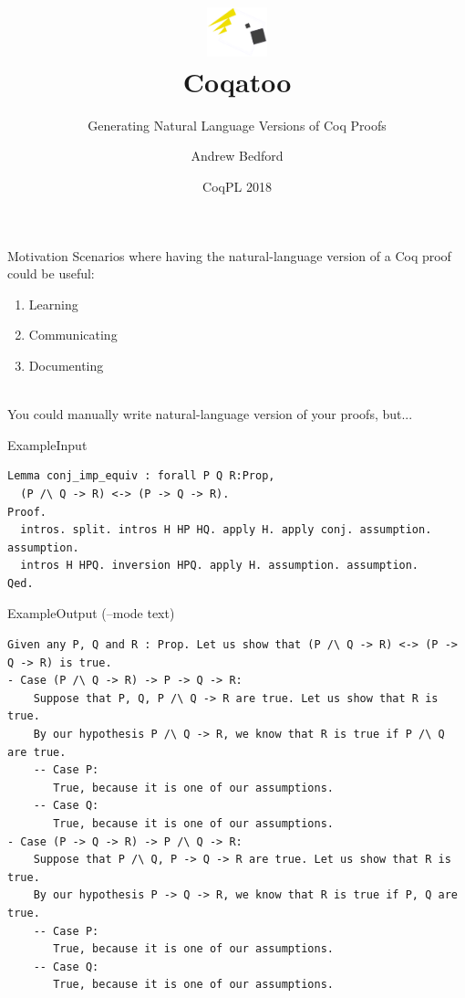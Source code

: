 \documentclass[pdf]{beamer}
\title[Coqatoo]{\includegraphics[width=50pt]{images/logo.png}\\Coqatoo}
\subtitle{Generating Natural Language Versions of Coq Proofs}
\author{Andrew Bedford}
\institute{Laval University}
\date{CoqPL 2018}
\begin{document}
\begin{frame}
    \titlepage
\end{frame}

\begin{frame}{Motivation}
Scenarios where having the natural-language version of a Coq proof could be useful:
\begin{enumerate}
    \item Learning
    \item Communicating
    \item Documenting
\end{enumerate}
~\\
You could manually write natural-language version of your proofs, but...
\end{frame}

\begin{frame}[fragile]{Example}{Input}
\begin{adjustbox}{minipage=\linewidth,bgcolor=coqatoo-gray,trim=-3pt 5pt -3pt 5pt}        
\begin{lstlisting}[label=listing:input]
Lemma conj_imp_equiv : forall P Q R:Prop, 
  (P /\ Q -> R) <-> (P -> Q -> R).
Proof.
  intros. split. intros H HP HQ. apply H. apply conj. assumption. assumption. 
  intros H HPQ. inversion HPQ. apply H. assumption. assumption.
Qed.
\end{lstlisting}
\end{adjustbox}
\end{frame}

\begin{frame}[fragile]{Example}{Output (--mode text)}
\begin{adjustbox}{minipage=\linewidth,bgcolor=coqatoo-gray,trim=-3pt 5pt -3pt 5pt}
\begin{lstlisting}[keywordstyle=\color{white}]
Given any P, Q and R : Prop. Let us show that (P /\ Q -> R) <-> (P -> Q -> R) is true.
- Case (P /\ Q -> R) -> P -> Q -> R:
    Suppose that P, Q, P /\ Q -> R are true. Let us show that R is true.
    By our hypothesis P /\ Q -> R, we know that R is true if P /\ Q are true.
    -- Case P:
       True, because it is one of our assumptions.
    -- Case Q:
       True, because it is one of our assumptions.
- Case (P -> Q -> R) -> P /\ Q -> R:
    Suppose that P /\ Q, P -> Q -> R are true. Let us show that R is true.
    By our hypothesis P -> Q -> R, we know that R is true if P, Q are true.
    -- Case P:
       True, because it is one of our assumptions.
    -- Case Q:
       True, because it is one of our assumptions.
\end{lstlisting}
\end{adjustbox}
\end{frame}
\end{document}
